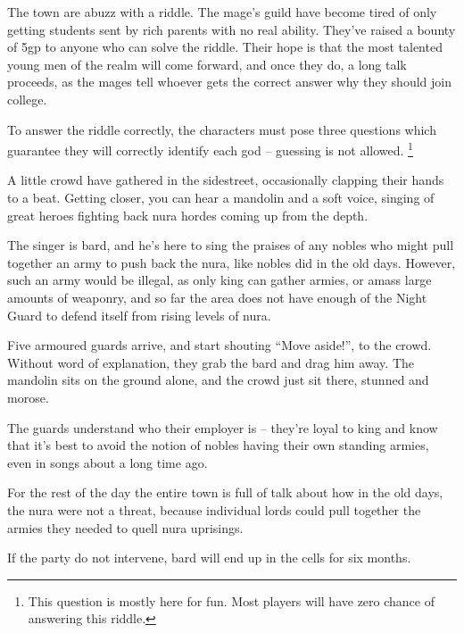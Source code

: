 \begin{multicols}{2}
The town are abuzz with a riddle.  The mage's guild have become tired of only getting students sent by rich parents with no real ability.  They've raised a bounty of 5gp to anyone who can solve the riddle.  Their hope is that the most talented young men of the realm will come forward, and once they do, a long talk proceeds, as the mages tell whoever gets the correct answer why they should join \gls{college}.

To answer the riddle correctly, the characters must pose three questions which guarantee they will correctly identify each god -- guessing is not allowed.
\footnote{This question is mostly here for fun.  Most players will have zero chance of answering this riddle.}


\begin{boxtext}
	A little crowd have gathered in the sidestreet, occasionally clapping their hands to a beat.  Getting closer, you can hear a mandolin and a soft voice, singing of great heroes fighting back nura hordes coming up from the depth.
\end{boxtext}

The singer is \gls{bard}, and he's here to sing the praises of any nobles who might pull together an army to push back the nura, like nobles did in the old days.  However, such an army would be illegal, as only \gls{king} can gather armies, or amass large amounts of weaponry, and so far the area does not have enough of the Night Guard to defend itself from rising levels of nura.

\begin{boxtext}
	Five armoured guards arrive, and start shouting ``Move aside!'', to the crowd.  Without word of explanation, they grab the bard and drag him away.  The mandolin sits on the ground alone, and the crowd just sit there, stunned and morose.
\end{boxtext}

The guards understand who their employer is -- they're loyal to \gls{king} and know that it's best to avoid the notion of nobles having their own standing armies, even in songs about a long time ago.

For the rest of the day the entire town is full of talk about how in the old days, the nura were not a threat, because individual lords could pull together the armies they needed to quell nura uprisings.

If the party do not intervene, \gls{bard} will end up in the cells for six months.


\end{multicols}
